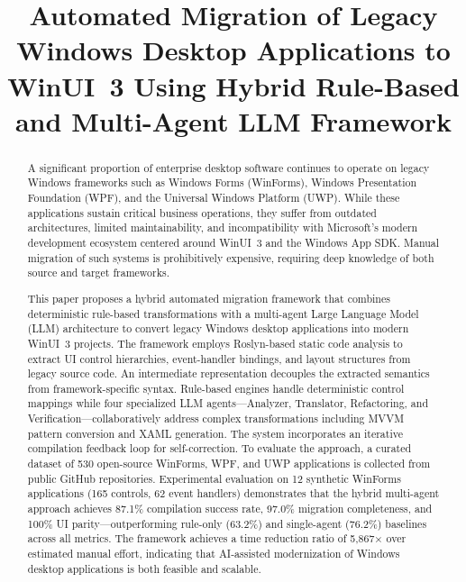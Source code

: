 \documentclass[conference]{IEEEtran}
\begin{document}
\title{Automated Migration of Legacy Windows Desktop Applications to WinUI~3 Using Hybrid Rule-Based and Multi-Agent LLM Framework}

\author{
\and
{}
}

\maketitle

\begin{abstract}
A significant proportion of enterprise desktop software continues to operate on legacy Windows frameworks such as Windows Forms (WinForms), Windows Presentation Foundation (WPF), and the Universal Windows Platform (UWP). While these applications sustain critical business operations, they suffer from outdated architectures, limited maintainability, and incompatibility with Microsoft's modern development ecosystem centered around WinUI~3 and the Windows App SDK. Manual migration of such systems is prohibitively expensive, requiring deep knowledge of both source and target frameworks.

This paper proposes a hybrid automated migration framework that combines deterministic rule-based transformations with a multi-agent Large Language Model (LLM) architecture to convert legacy Windows desktop applications into modern WinUI~3 projects. The framework employs Roslyn-based static code analysis to extract UI control hierarchies, event-handler bindings, and layout structures from legacy source code. An intermediate representation decouples the extracted semantics from framework-specific syntax. Rule-based engines handle deterministic control mappings while four specialized LLM agents---Analyzer, Translator, Refactoring, and Verification---collaboratively address complex transformations including MVVM pattern conversion and XAML generation. The system incorporates an iterative compilation feedback loop for self-correction. To evaluate the approach, a curated dataset of 530 open-source WinForms, WPF, and UWP applications is collected from public GitHub repositories. Experimental evaluation on 12 synthetic WinForms applications (165 controls, 62 event handlers) demonstrates that the hybrid multi-agent approach achieves 87.1\% compilation success rate, 97.0\% migration completeness, and 100\% UI parity---outperforming rule-only (63.2\%) and single-agent (76.2\%) baselines across all metrics. The framework achieves a time reduction ratio of 5,867$\times$ over estimated manual effort, indicating that AI-assisted modernization of Windows desktop applications is both feasible and scalable.
\end{abstract}
\end{document}
